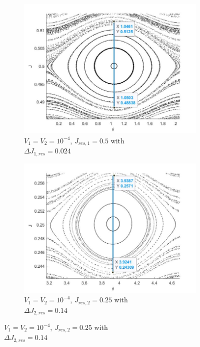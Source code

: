 \begin{figure}[hb!]
	\centering
	\begin{subfigure}{.49\textwidth}
  		\includegraphics[scale=0.3,left]{Hamiltonian_1/numerical/figs/Q5_dj_1e-4_res1}
  		\caption{$V_1=V_2=10^{-4}$, $J_{res,1}=0.5$ with \\$\Delta J_{1,res}=0.024$}
  		\label{fig2.10a}
	\end{subfigure}%
	\begin{subfigure}{.5\textwidth}
  		\includegraphics[scale=0.3,right]{Hamiltonian_1/numerical/figs/Q5_dj_1e-4_res2}
  		\caption{$V_1=V_2=10^{-4}$, $J_{res,2}=0.25$ with \\$\Delta J_{2,res}=0.14$}

\end{subfigure}
\end{figure}
